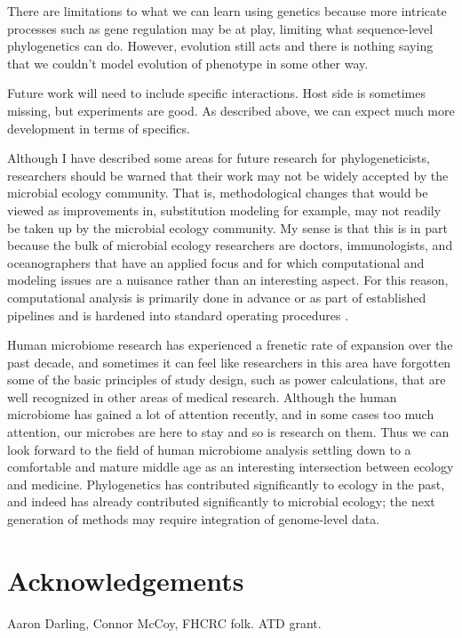 \documentclass{amsart}
\newcommand{\forarxiv}[1]{#1}
\newcommand{\notforarxiv}[1]{}
\newcommand{\FIGmassTransport}{\
\begin{figure}[ht]
\begin{center}
  \forarxiv{\texttt{[image: mass\_transport.pdf]}}
\end{center}
\caption{\
  Caption goes here.
}
\label{FIGmassTransport}
\end{figure}
}
\begin{document}
There are limitations to what we can learn using genetics because more intricate processes such as gene regulation may be at play, limiting what sequence-level phylogenetics can do.
However, evolution still acts and there is nothing saying that we couldn't model evolution of phenotype in some other way.

Future work will need to include specific interactions.
Host side is sometimes missing, but experiments are good.
As described above, we can expect much more development in terms of specifics.
\citep{hooper2012interactions}

Although I have described some areas for future research for phylogeneticists, researchers should be warned that their work may not be widely accepted by the microbial ecology community.
That is, methodological changes that would be viewed as improvements in, substitution modeling for example, may not readily be taken up by the microbial ecology community.
My sense is that this is in part because the bulk of microbial ecology researchers are doctors, immunologists, and oceanographers that have an applied focus and for which computational and modeling issues are a nuisance rather than an interesting aspect.
For this reason, computational analysis is primarily done in advance or as part of established pipelines and is hardened into standard operating procedures \citep{peplies2008standard}.

Human microbiome research has experienced a frenetic rate of expansion over the past decade, and sometimes it can feel like researchers in this area have forgotten some of the basic principles of study design, such as power calculations, that are well recognized in other areas of medical research.
Although the human microbiome has gained a lot of attention recently, and in some cases too much attention, our microbes are here to stay and so is research on them.
Thus we can look forward to the field of human microbiome analysis settling down to a comfortable and mature middle age as an interesting intersection between ecology and medicine.
Phylogenetics has contributed significantly to ecology in the past, and indeed has already contributed significantly to microbial ecology; the next generation of methods may require integration of genome-level data.



\section{Acknowledgements}
Aaron Darling, Connor McCoy,
FHCRC folk.
ATD grant.


\notforarxiv{
\newpage
\section{Figure Legends}
\clearpage

\newpage
}



\end{document}
